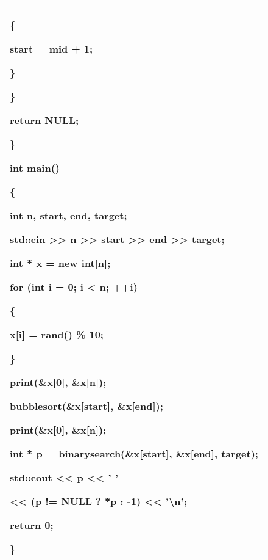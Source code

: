 \documentclass[
]{article}
\begin{document}
\begin{longtable}[]{@{}l@{}}
\begin{minipage}[t]{0.97\columnwidth}
\{

start = mid + 1;

\}

\}

return NULL;

\}

int main()

\{

int n, start, end, target;

std::cin \textgreater\textgreater{} n \textgreater\textgreater{} start
\textgreater\textgreater{} end \textgreater\textgreater{} target;

int * x = new int{[}n{]};

for (int i = 0; i \textless{} n; ++i)

\{

x{[}i{]} = rand() \% 10;

\}

print(\&x{[}0{]}, \&x{[}n{]});

bubblesort(\&x{[}start{]}, \&x{[}end{]});

print(\&x{[}0{]}, \&x{[}n{]});

int * p = binarysearch(\&x{[}start{]}, \&x{[}end{]}, target);

std::cout \textless\textless{} p \textless\textless{} ' '

\textless\textless{} (p != NULL ? *p : -1) \textless\textless{}
'\textbackslash n';

return 0;

\}\strut
\end{minipage}\tabularnewline
\bottomrule
\end{longtable}
\end{document}
